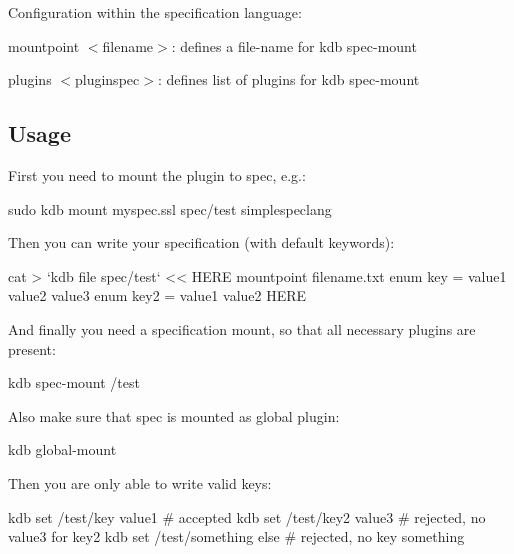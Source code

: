 Configuration within the specification language\+:


\begin{DoxyItemize}
\item {\ttfamily mountpoint $<$filename$>$}\+: defines a file-\/name for {\ttfamily kdb spec-\/mount}
\item {\ttfamily plugins $<$pluginspec$>$}\+: defines list of plugins for {\ttfamily kdb spec-\/mount}
\end{DoxyItemize}

\subsection*{Usage}

First you need to mount the plugin to spec, e.\+g.\+:


\begin{DoxyCode}
sudo kdb mount myspec.ssl spec/test simplespeclang
\end{DoxyCode}


Then you can write your specification (with default keywords)\+:


\begin{DoxyCode}
cat > `kdb file spec/test` << HERE
mountpoint filename.txt
enum key = value1 value2 value3
enum key2 = value1 value2
HERE
\end{DoxyCode}


And finally you need a specification mount, so that all necessary plugins are present\+:


\begin{DoxyCode}
kdb spec-mount /test
\end{DoxyCode}


Also make sure that {\ttfamily spec} is mounted as global plugin\+:


\begin{DoxyCode}
kdb global-mount
\end{DoxyCode}


Then you are only able to write valid keys\+:


\begin{DoxyCode}
kdb set /test/key value1  # accepted
kdb set /test/key2 value3 # rejected, no value3 for key2
kdb set /test/something else # rejected, no key something
\end{DoxyCode}
 